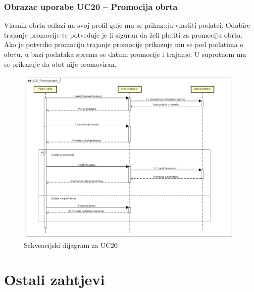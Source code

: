           \newpage
	            
	            \subsubsection{Obrazac uporabe UC20 – Promocija obrta}
	            Vlasnik obrta odlazi na svoj profil gdje mu se prikazuju vlastiti podatci. Odabire trajanje promocije te potvrđuje je li siguran da želi platiti za promociju obrta. Ako je potvrdio promociju trajanje promocije prikazuje mu se pod podatima o obrtu, u bazi podataka sprema se datum promocije i trajanje. U suprotnom mu se prikazuje da obrt nije promoviran.
	            
	            \begin{figure}[H]
			        \includegraphics[width=\textwidth]{slike/sekvencijski3.png} 
			            \caption{Sekvencijski dijagram za UC20}
			        \label{fig:Sekvencijski dijagram za UC20}
		        \end{figure}

          \newpage
	            
		\section{Ostali zahtjevi}
		
